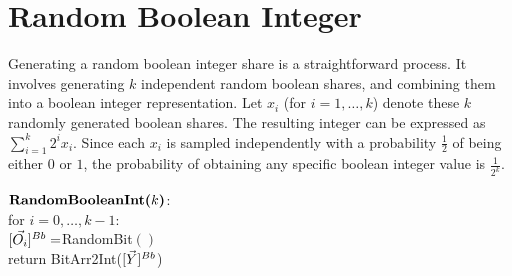 \section{Random Boolean Integer}

Generating a random boolean integer share is a straightforward process. It involves 
generating $k$ independent random boolean shares, and combining them into a
boolean integer representation. Let $x_i$ (for $i=1,\ldots,k$) denote these $k$ 
randomly generated boolean shares. The resulting integer can be expressed as 
$\sum_{i=1}^{k}2^ix_i$. Since each $x_i$ is sampled independently with a probability 
$\frac{1}{2}$ of being either $0$ or $1$, the probability of obtaining any specific 
boolean integer value is $\frac{1}{2^k}$.\\

\begin{protocol}
	
	$\textbf{RandomBooleanInt(}k\textbf{)}$:\\
	\indent for $i =0, \ldots, k-1$:\\
	\indent \indent $[\vec{O_i}]^{Bb} = $RandomBit$()$ \\
	\indent return BitArr2Int($[\vec{Y}]^{Bb}$)
	
\end{protocol}

